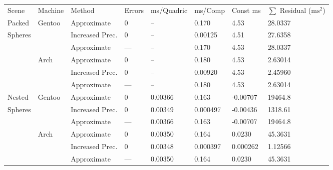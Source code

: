\begin{tabular}{|l|l|ll|lll|l|}
\hline
Scene & Machine & Method & Errors & ms/Quadric & ms/Comp & Const ms & $\sum$ Residual ($\text{ms}^2$)\\
\hhline{|=|=|==|===|=|}
\hhline{|~|-|--|---|-|}
Packed & Gentoo & Approximate & \hphantom{00}0 & -- & \hphantom{-}0.170 & \hphantom{-}4.53 & \hphantom{0000}\hphantom{-}28.0337\\
Spheres &  & Increased Prec. & \hphantom{00}0 & -- & \hphantom{-}0.00125 & \hphantom{-}4.51 & \hphantom{0000}\hphantom{-}27.6358\\
 &  & Approximate & \hphantom{-}--- & -- & \hphantom{-}0.170 & \hphantom{-}4.53 & \hphantom{0000}\hphantom{-}28.0337\\
\hhline{|~|-|--|---|-|}
 & Arch & Approximate & \hphantom{00}0 & -- & \hphantom{-}0.180 & \hphantom{-}4.53 & \hphantom{00000}\hphantom{-}2.63014\\
 &  & Increased Prec. & \hphantom{00}0 & -- & \hphantom{-}0.00920 & \hphantom{-}4.53 & \hphantom{00000}\hphantom{-}2.45960\\
 &  & Approximate & \hphantom{-}--- & -- & \hphantom{-}0.180 & \hphantom{-}4.53 & \hphantom{00000}\hphantom{-}2.63014\\
\hhline{|-|-|--|---|-|}
\hhline{|~|-|--|---|-|}
Nested & Gentoo & Approximate & \hphantom{00}0 & 0.00366 & \hphantom{-}0.163 & -0.00707 & \hphantom{0}\hphantom{-}19464.8\\
Spheres &  & Increased Prec. & \hphantom{00}0 & 0.00349 & \hphantom{-}0.000497 & -0.00436 & \hphantom{00}\hphantom{-}1318.61\\
 &  & Approximate & \hphantom{-}--- & 0.00366 & \hphantom{-}0.163 & -0.00707 & \hphantom{0}\hphantom{-}19464.8\\
\hhline{|~|-|--|---|-|}
 & Arch & Approximate & \hphantom{00}0 & 0.00350 & \hphantom{-}0.164 & \hphantom{-}0.0230 & \hphantom{0000}\hphantom{-}45.3631\\
 &  & Increased Prec. & \hphantom{00}0 & 0.00348 & \hphantom{-}0.000397 & \hphantom{-}0.000262 & \hphantom{00000}\hphantom{-}1.12566\\
 &  & Approximate & \hphantom{-}--- & 0.00350 & \hphantom{-}0.164 & \hphantom{-}0.0230 & \hphantom{0000}\hphantom{-}45.3631\\
\hline
\end{tabular}
